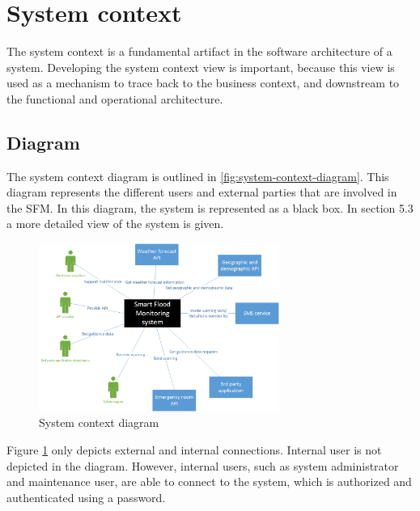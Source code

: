 \section{System context}
The system context is a fundamental artifact in the software architecture of a system. Developing the system context view is important, because this view is used as a mechanism to trace back to the business context, and downstream to the functional and operational architecture.

\subsection{Diagram}
\label{subsec:system-diagram}
The system context diagram is outlined in \autoref{fig:system-context-diagram}. This diagram represents the different users and external parties that are involved in the SFM. In this diagram, the system is represented as a black box. In section 5.3 a more detailed view of the system is given. 

\begin{figure}[H]
	\centering
	\includegraphics[keepaspectratio=true,width=0.7\textwidth]{images/system_context.png}
	\caption{System context diagram}
	\label{fig:system-context-diagram}
\end{figure}

Figure \ref{fig:system-context-diagram} only depicts external and internal connections. Internal user is not depicted in the diagram. However, internal users, such as system administrator and maintenance user, are able to connect to the system, which is authorized and authenticated using a password.


